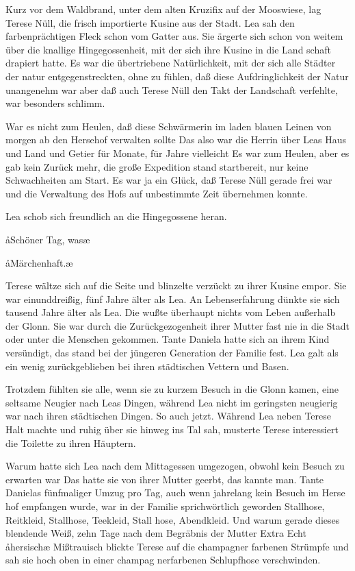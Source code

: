Kurz vor dem Waldbrand, unter dem alten Kruzifix auf der
Mooswiese, lag Terese Nüll, die frisch importierte Kusine
aus der Stadt. Lea sah den farbenprächtigen Fleck schon vom
Gatter aus. Sie ärgerte sich schon von weitem über die
knallige Hingegossenheit, mit der sich ihre Kusine in die Land\-%
schaft drapiert hatte. Es war die übertriebene Natürlichkeit,
mit der sich alle Städter der natur entgegenstreckten, ohne zu
fühlen, daß diese Aufdringlichkeit der Natur unangenehm
war\dopp{} aber daß auch Terese Nüll den Takt der Landschaft
verfehlte, war besonders schlimm.

War es nicht zum Heulen, daß diese Schwärmerin im laden\-%
blauen Leinen von morgen ab den Hersehof verwalten sollte\frag{}
Das also war die Herrin über Leas Haus und Land und
Getier für Monate, für Jahre vielleicht\frag{} Es war zum Heulen,
aber es gab kein Zurück mehr, die große Expedition stand
startbereit, nur keine Schwachheiten am Start. Es war ja
ein Glück, daß Terese Nüll gerade frei war und die Verwaltung
des Hofs auf unbestimmte Zeit übernehmen konnte.

Lea schob sich freundlich an die Hingegossene heran.

\aa{}Schöner Tag, was\frag{}\ae{}

\aa{}Märchenhaft.\ae{}

Terese wältze sich auf die Seite und blinzelte verzückt zu ihrer
Kusine empor. Sie war einunddreißig, fünf Jahre älter als
Lea. An Lebenserfahrung dünkte sie sich tausend Jahre älter
als Lea. Die wußte überhaupt nichts vom Leben außerhalb
der Glonn. Sie war durch die Zurückgezogenheit ihrer Mutter
fast nie in die Stadt oder unter die Menschen gekommen. Tante
Daniela hatte sich an ihrem Kind versündigt, das stand bei
der jüngeren Generation der Familie fest. Lea galt als ein
wenig zurückgeblieben bei ihren städtischen Vettern und Basen.

Trotzdem fühlten sie alle, wenn sie zu kurzem Besuch in die
Glonn kamen, eine seltsame Neugier nach Leas Dingen,
während Lea nicht im geringsten neugierig war nach ihren
städtischen Dingen. So auch jetzt. Während Lea neben Terese
Halt machte und ruhig über sie hinweg ins Tal sah, musterte
Terese interessiert die Toilette zu ihren Häuptern.

Warum hatte sich Lea nach dem Mittagessen umgezogen,
obwohl kein Besuch zu erwarten war\frag{} Das hatte sie von ihrer
Mutter geerbt, das kannte man. Tante Danielas fünfmaliger
Umzug pro Tag, auch wenn jahrelang kein Besuch im Herse\-%
hof empfangen wurde, war in der Familie sprichwörtlich
geworden\dopp{} Stallhose, Reitkleid, Stallhose, Teekleid, Stall\-%
hose, Abendkleid. Und warum gerade dieses blendende Weiß,
zehn Tage nach dem Begräbnis der Mutter\frag{} Extra\frag{} Echt
\aa{}hersisch\ae{}\ausr{} Mißtrauisch blickte Terese auf die champagner\-%
farbenen Strümpfe und sah sie hoch oben in einer champag\-%
nerfarbenen Schlupfhose verschwinden.

